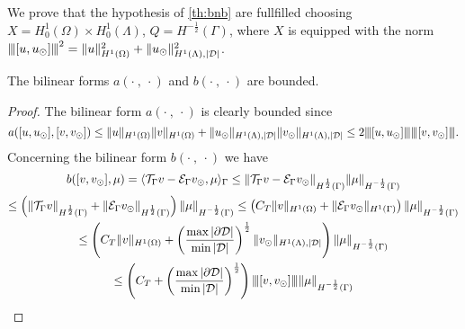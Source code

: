 We prove that the hypothesis of \ref{th:bnb} are fullfilled choosing 
$X=H^1_0(\Omega) \times H^1_0(\Lambda)$, $Q=H^{-\frac 12}(\Gamma)$, where $X$  is equipped with the norm ${\left\vert\kern-0.25ex\left\vert\kern-0.25ex\left\vert [u,u_{\odot} ] \right\vert\kern-0.25ex\right\vert\kern-0.25ex\right\vert}^2=\|u\|^2_{H^1(\Omega)} + \|u_{\odot}\|^2_{H^1(\Lambda),|\mathcal{D}|}$.
\begin{lemma}\label{lemma:prob1_boundedness} 
The bilinear forms $a(\cdot \ , \ \cdot)$ and $b(\cdot \ , \ \cdot)$ are bounded.
\end{lemma}
\begin{proof}
The bilinear form $a(\cdot \ , \ \cdot)$ is clearly bounded since
\begin{equation*}
a([u, u_{\odot}], [v, v_{\odot}])\leq \|u\|_{H^1(\Omega)}\|v\|_{H^1(\Omega)} + \|u_{\odot}\|_{H^1(\Lambda), |\mathcal{D}|}\|v_{\odot}\|_{H^1(\Lambda), |\mathcal{D}|} \leq 2 {\left\vert\kern-0.25ex\left\vert\kern-0.25ex\left\vert [u, u_{\odot}] \right\vert\kern-0.25ex\right\vert\kern-0.25ex\right\vert}{\left\vert\kern-0.25ex\left\vert\kern-0.25ex\left\vert [v, v_{\odot}] \right\vert\kern-0.25ex\right\vert\kern-0.25ex\right\vert}.
\end{equation*}
Concerning the bilinear form $b(\cdot \ , \ \cdot)$ we have
\begin{multline*}
b([v, v_{\odot}], \mu)= \langle {\mathcal{T}_\Gamma} v - \mathcal{E}_\Gamma v_{\odot} , \mu \rangle_\Gamma 
\leq \|{\mathcal{T}_\Gamma} v - \mathcal{E}_\Gamma v_{\odot}\|_{H^{\frac 12}(\Gamma)}\|\mu\|_{H^{-\frac 12}(\Gamma)}\\
\leq \left(\|{\mathcal{T}_\Gamma} v\|_{H^{\frac 12}(\Gamma)} + \|\mathcal{E}_\Gamma v_{\odot}\|_{H^{\frac 12}(\Gamma)}\right)\|\mu\|_{H^{-\frac 12}(\Gamma)}
\leq \left(C_T \|v\|_{H^1(\Omega)} + \|\mathcal{E}_\Gamma v_{\odot}\|_{H^1(\Gamma)}\right)\|\mu\|_{H^{-\frac 12}(\Gamma)}\\
\leq \left(C_T \|v\|_{H^1(\Omega)} + \left(\frac{\max |\partial\mathcal{D}|}{\min |\mathcal{D}|}\right)^{\frac 12} \|v_{\odot}\|_{H^1(\Lambda),|\mathcal{D}|}\right)\|\mu\|_{H^{-\frac 12}(\Gamma)}\\
\leq \left( C_T + \left(\frac{\max |\partial\mathcal{D}|}{\min |\mathcal{D}|}\right)^{\frac 12}\right) {\left\vert\kern-0.25ex\left\vert\kern-0.25ex\left\vert [v,v_{\odot}] \right\vert\kern-0.25ex\right\vert\kern-0.25ex\right\vert}\|\mu\|_{H^{-\frac 12}(\Gamma)}
\end{multline*}
\end{proof}

